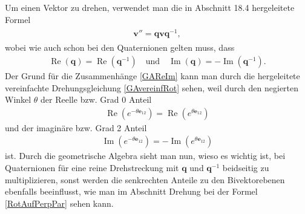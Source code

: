 Um einen Vektor zu drehen, verwendet man die in Abschnitt 18.4 hergeleitete Formel 
\begin{align} \label{QuatRotGA}
\begin{split} 
\mathbf{v}'' = \mathbf{qvq}^{-1},
\end{split}
\end{align}
wobei wie auch schon bei den Quaternionen gelten muss, dass
\begin{align} \label{GAReIm}
\operatorname{Re}(\mathbf{q}) = \operatorname{Re}(\mathbf{q}^{-1}) \quad\text{und}\quad \operatorname{Im}(\mathbf{q}) = -\operatorname{Im}(\mathbf{q}^{-1}).
\end{align}
Der Grund für die Zusammenhänge \eqref{GAReIm} kann man durch die hergeleitete vereinfachte Drehungsgleichung \eqref{GAvereinfRot} sehen, weil durch den negierten Winkel $\theta$ der Reelle bzw. Grad 0 Anteil
\begin{align}
\operatorname{Re}(e^{-\theta \mathbf{e}_{12}}) = \operatorname{Re}(e^{\theta \mathbf{e}_{12}})
\end{align}
und der imaginäre bzw. Grad 2 Anteil
\begin{align}
\operatorname{Im}(e^{-\theta \mathbf{e}_{12}}) = -\operatorname{Im}(e^{\theta \mathbf{e}_{12}})
\end{align}
ist. Durch die geometrische Algebra sieht man nun, wieso es wichtig ist, bei Quaternionen für eine reine Drehstreckung mit $\mathbf{q}$ und $\mathbf{q}^{-1}$ beidseitig zu multiplizieren, sonst werden die senkrechten Anteile zu den Bivektorebenen ebenfalls beeinflusst, wie man im Abschnitt Drehung bei der Formel \eqref{RotAufPerpPar} sehen kann.
